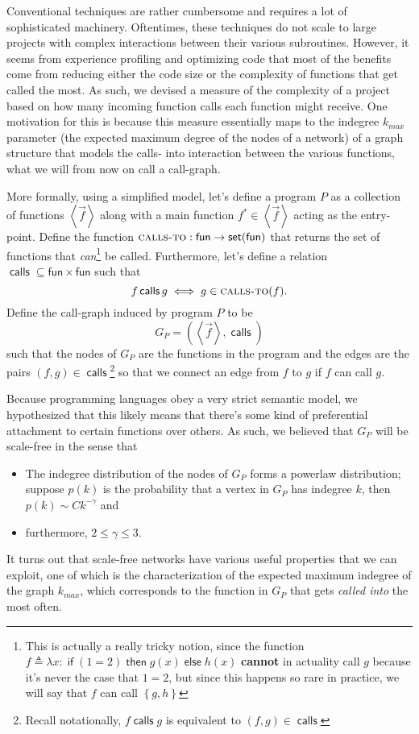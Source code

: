 \documentclass[11pt,a4paper]{article}
\newcommand {\coo} [1] {\ensuremath{\operatorname{\mathsf{#1}}}}
\newcommand {\co} [1] {\coo{#1}}
\newcommand {\Iff}[3] {\co{if} (#1) \co{then} #2 \co{else} #3}
\newcommand{\Rec}[1]{\left\{#1\right\}}
\newcommand{\pa}[1]{\left(#1\right)}
\newcommand{\ba}[1]{\left\langle #1\right\rangle}
\newcommand{\f}[1]{\textsc{#1}}
\newcommand{\g}[1]{\textsf{#1}}
\begin{document}
Conventional techniques are rather cumbersome and requires a lot of 
sophisticated machinery. Oftentimes, these techniques do not scale to large 
projects with complex interactions between their various subroutines. However, 
it seems from experience profiling and optimizing code that most of the 
benefits come from reducing either the code size or the complexity of 
functions that get called the most. As such, we devised a measure of the 
complexity of a project based on how many incoming function calls each 
function might receive. One motivation for this is because this measure 
essentially maps to the indegree $k_{max}$ parameter (the expected maximum 
degree of the nodes of a network) of a graph structure that models the calls-
into interaction between the various functions, what we will from now on call
 a call-graph.

More formally, using a simplified model, let's define a program $P$ as a 
collection of functions $\ba{\vec f}$ along with a main function 
$f^* \in \ba{\vec f}$ acting as the entry-point. Define the function 
$\f{calls-to}: \g{fun} \to \g{set}(\g{fun})$ that returns the set of functions 
that \textit{can}\footnote{This is actually a really tricky notion, since the 
function $f \triangleq \lambda x: \Iff{1 = 2}{g(x)}{h(x)}$ \textbf{cannot} in 
actuality call $g$ because it's never the case that $1 = 2$, but since this 
happens so rare in practice, we will say that $f$ can call $\Rec{g,h}$} be 
called. Furthermore, let's define a relation 
$\co{calls} \subseteq \g{fun} \times \g{fun}$ such that 
$$f \co{calls} g \iff g \in \f{calls-to}(f).$$
Define the call-graph induced by program $P$ to be 
$$G_P = \pa{\ba{\vec f}, \co{calls}}$$
such that the nodes of $G_P$ are the functions in the program and the edges 
are the pairs $(f,g) \in \co{calls}$\footnote{Recall notationally, 
$f\co{calls}g$ is equivalent to $(f,g) \in \co{calls}$} so that we connect an 
edge from $f$ to $g$ if $f$ can call $g$.

Because programming languages obey a very strict semantic model, we 
hypothesized that this likely means that there's some kind of preferential 
attachment to certain functions over others. As such, we believed that $G_P$ 
will be scale-free in the sense that\cite{DUR}
\begin{itemize}
\item The indegree distribution of the nodes of $G_P$ forms a powerlaw 
distribution; suppose $p(k)$ is the probability that a vertex in $G_P$ has 
indegree $k$, then $p(k) \sim C k^{-\gamma}$ and
\item furthermore, $2 \le \gamma \le 3$.
\end{itemize}
It turns out that scale-free networks have various useful properties that we 
can exploit, one of which is the characterization of the expected maximum 
indegree of the graph $k_{max}$, which corresponds to the function in $G_P$ 
that gets \emph{called into} the most often. 
\end{document}
